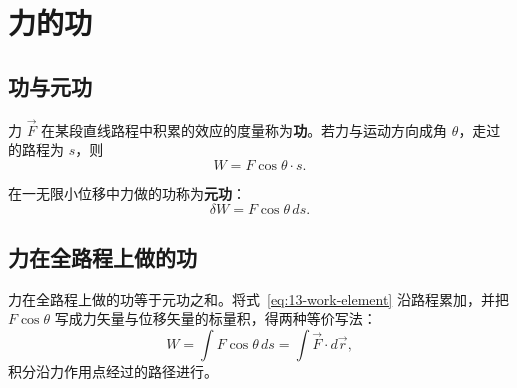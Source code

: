 \section{力的功}

\subsection{功与元功}

\begin{definition}[功]
力 $\vec{F}$ 在某段直线路程中积累的效应的度量称为\textbf{功}。若力与运动方向成角 $\theta$，走过的路程为 $s$，则
\begin{equation}\label{eq:13-work-linear}
  W=F\cos\theta\cdot s .
\end{equation}
\end{definition}

\begin{definition}[元功]
在一无限小位移中力做的功称为\textbf{元功}：
\begin{equation}\label{eq:13-work-element}
  \delta W=F\cos\theta\,ds .
\end{equation}
\end{definition}

\subsection{力在全路程上做的功}

力在全路程上做的功等于元功之和。将式~\eqref{eq:13-work-element} 沿路程累加，并把 $F\cos\theta$ 写成力矢量与位移矢量的标量积，得两种等价写法：
\begin{equation}\label{eq:13-work-total}
  W=\int F\cos\theta\,ds=\int\vec{F}\cdot d\vec{r},
\end{equation}
积分沿力作用点经过的路径进行。

